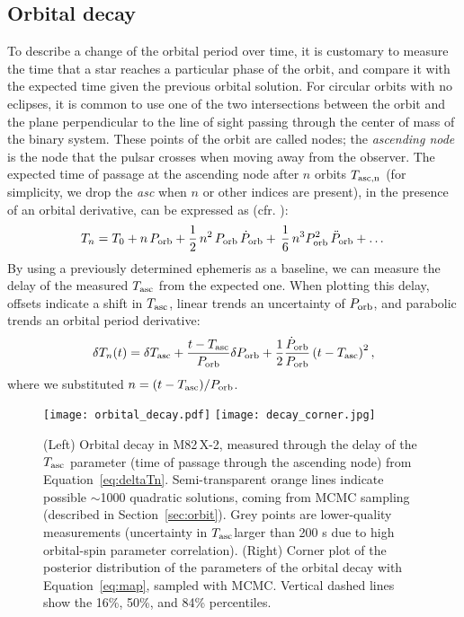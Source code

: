 \documentclass[twocolumn]{aastex631}
\newcommand{\Mtwo}{M82\,X-2\xspace}
\newcommand{\Porbdot}{\ensuremath{\dot{P}_{\rm orb}}}
\newcommand{\Porb}{\ensuremath{P_{\rm orb}}}
\newcommand{\tasc}{\ensuremath{T_{\rm asc}{}}}
\newcommand{\secref}{Section~\ref}
\begin{document}
\subsection{Orbital decay}\label{sec:decay}\label{sec:orbit}
To describe a change of the orbital period over time, it is customary to measure the time that a star reaches a particular phase of the orbit, and compare it with the expected time given the previous orbital solution.
For circular orbits with no eclipses, it is common to use one of the two intersections between the orbit and the plane perpendicular to the line of sight passing through the center of mass of the binary system.
These points of the orbit are called nodes;
the \textit{ascending node} is the node that the pulsar crosses when moving away from the observer.
The expected time of passage at the ascending node after $n$ orbits $T_{\rm asc,n}$ (for simplicity, we drop the \textit{asc} when $n$ or other indices are present), in the presence of an orbital derivative, can be expressed as (cfr. \citealt{kelleyDeterminationOrbitGX1980,falangaEphemerisOrbitalDecay2015}):
\begin{equation}\label{eq:Tn}
    T_n = T_0 + n\,\Porb + \frac{1}{2}\,n^2\,\Porb\,\Porbdot +\,\frac{1}{6}\,n^3\Porb^2\,\ddot{P}_{\rm orb} +\dots
\end{equation}
By using a previously determined ephemeris as a baseline, we can measure the delay of the measured $\tasc$ from the expected one.
When plotting this delay, offsets indicate a shift in $\tasc$, linear trends an uncertainty of $\Porb$, and parabolic trends an orbital period derivative:
\begin{equation}\label{eq:deltaTn}
    \delta T_n(t) = \delta \tasc + \frac{t - \tasc}{\Porb}\delta{\Porb} + \frac{1}{2}\frac{\Porbdot}{\Porb}\left(t - \tasc\right)^2,
\end{equation}
where we substituted $n=(t-\tasc)/\Porb$.

\begin{figure*}[ht]
    \centering
    \texttt{[image: orbital\_decay.pdf]}
    \texttt{[image: decay\_corner.jpg]}
    \caption{(Left) Orbital decay in \Mtwo, measured through the delay of the $\tasc$ parameter (time of passage through the ascending node) from Equation~\ref{eq:deltaTn}. Semi-transparent orange lines indicate possible $\sim$1000 quadratic solutions, coming from MCMC sampling (described in \secref{sec:orbit}).
    Grey points are lower-quality measurements (uncertainty in \tasc larger than 200 s due to high orbital-spin parameter correlation).
    (Right) Corner plot of the posterior distribution of the parameters  of the orbital decay with Equation~\ref{eq:map}, sampled with MCMC. Vertical dashed lines show the 16\%, 50\%, and 84\% percentiles.
    }
    \label{fig:decay}\label{fig:mcmc}
\end{figure*}
\end{document}
